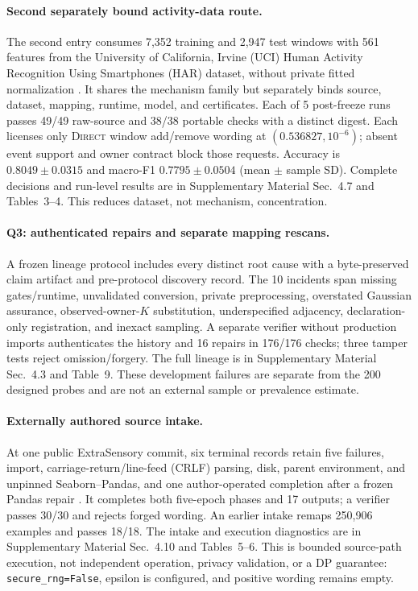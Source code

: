 \documentclass[letterpaper]{article} %
\newcommand{\Direct}{\textsc{Direct}}
\newcommand{\AuditRetrospectiveIncidentCount}{10}
\newcommand{\AuditRetrospectiveCheckCount}{176}
\newcommand{\AuditUciRunCount}{5}
\newcommand{\AuditUciFullCheckCount}{49}
\newcommand{\AuditUciPortableCheckCount}{38}
\newcommand{\AuditUciAccuracyMean}{0.8049}
\newcommand{\AuditUciAccuracySD}{0.0315}
\newcommand{\AuditUciMacroFOneMean}{0.7795}
\newcommand{\AuditUciMacroFOneSD}{0.0504}
\begin{document}
\paragraph{Second separately bound activity-data route.}
The second entry consumes 7,352 training and 2,947 test windows with 561 features from the University of California, Irvine (UCI) Human Activity Recognition Using Smartphones (HAR) dataset, without private fitted normalization \citep{anguita2013har,ucihar2013dataset}. It shares the mechanism family but separately binds source, dataset, mapping, runtime, model, and certificates. Each of \AuditUciRunCount{} post-freeze runs passes \AuditUciFullCheckCount/\AuditUciFullCheckCount{} raw-source and \AuditUciPortableCheckCount/\AuditUciPortableCheckCount{} portable checks with a distinct digest. Each licenses only \Direct{} window add/remove wording at $(0.536827,10^{-6})$; absent event support and owner contract block those requests. Accuracy is $\AuditUciAccuracyMean\pm\AuditUciAccuracySD$ and macro-F1 $\AuditUciMacroFOneMean\pm\AuditUciMacroFOneSD$ (mean $\pm$ sample SD). Complete decisions and run-level results are in Supplementary Material Sec.~4.7 and Tables~3--4. This reduces dataset, not mechanism, concentration.

\paragraph{Q3: authenticated repairs and separate mapping rescans.}
A frozen lineage protocol includes every distinct root cause with a byte-preserved claim artifact and pre-protocol discovery record. The \AuditRetrospectiveIncidentCount{} incidents span missing gates/runtime, unvalidated conversion, private preprocessing, overstated Gaussian assurance, observed-owner-$K$ substitution, underspecified adjacency, declaration-only registration, and inexact sampling. A separate verifier without production imports authenticates the history and 16 repairs in \AuditRetrospectiveCheckCount/\AuditRetrospectiveCheckCount{} checks; three tamper tests reject omission/forgery. The full lineage is in Supplementary Material Sec.~4.3 and Table~9. These development failures are separate from the 200 designed probes and are not an external sample or prevalence estimate.

\paragraph{Externally authored source intake.}
At one public ExtraSensory commit, six terminal records retain five failures, import, carriage-return/line-feed (CRLF) parsing, disk, parent environment, and unpinned Seaborn--Pandas, and one author-operated completion after a frozen Pandas repair \citep{extrasensorydp,vaizman2017extrasensory}. It completes both five-epoch phases and 17 outputs; a verifier passes 30/30 and rejects forged wording. An earlier intake remaps 250,906 examples and passes 18/18. The intake and execution diagnostics are in Supplementary Material Sec.~4.10 and Tables~5--6. This is bounded source-path execution, not independent operation, privacy validation, or a DP guarantee: \texttt{secure\_rng=False}, epsilon is configured, and positive wording remains empty.
\end{document}
